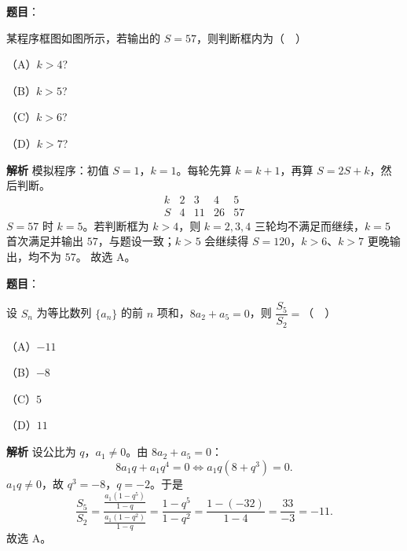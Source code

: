 \begin{answer}

\textbf{题目}：

某程序框图如图所示，若输出的 $S=57$，则判断框内为（　）

（A）$k>4$?

（B）$k>5$?

（C）$k>6$?

（D）$k>7$?
\nopagebreak[4]
\begin{center}\end{center}
\nopagebreak[4]
\textbf{解析}
模拟程序：初值 $S=1$，$k=1$。每轮先算 $k=k+1$，再算 $S=2S+k$，然后判断。
\nopagebreak[4]
\[\begin{array}{c|cccc}
k & 2 & 3 & 4 & 5\\ \hline
S & 4 & 11 & 26 & 57
\end{array}\]
$S=57$ 时 $k=5$。若判断框为 $k>4$，则 $k=2,3,4$ 三轮均不满足而继续，$k=5$ 首次满足并输出 $57$，与题设一致；$k>5$ 会继续得 $S=120$，$k>6$、$k>7$ 更晚输出，均不为 $57$。
故选 A。


\end{answer}
\begin{answer}

\textbf{题目}：

设 $S_n$ 为等比数列 $\{a_n\}$ 的前 $n$ 项和，$8a_2+a_5=0$，则 $\dfrac{S_5}{S_2}=$（　）

（A）$-11$

（B）$-8$

（C）$5$

（D）$11$

\textbf{解析}
设公比为 $q$，$a_1\neq0$。由 $8a_2+a_5=0$：
\nopagebreak[4]
\[8a_1q+a_1q^4=0\iff a_1q(8+q^3)=0.\]
$a_1q\neq0$，故 $q^3=-8$，$q=-2$。于是
\nopagebreak[4]
\[\frac{S_5}{S_2}=\frac{\frac{a_1(1-q^5)}{1-q}}{\frac{a_1(1-q^2)}{1-q}}
=\frac{1-q^5}{1-q^2}
=\frac{1-(-32)}{1-4}=\frac{33}{-3}=-11.\]
故选 A。


\end{answer}

